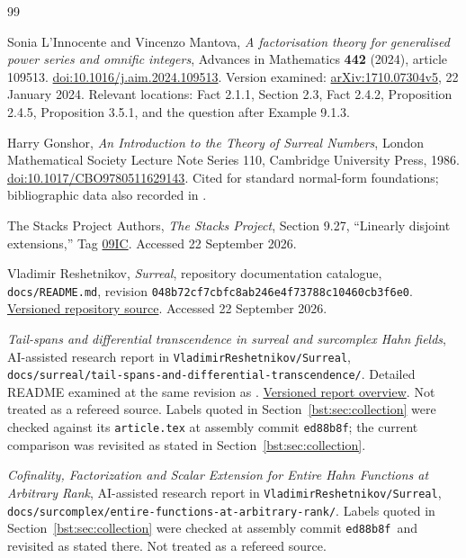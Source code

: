 \documentclass[11pt,letterpaper]{article}
\theoremstyle{definition}
\theoremstyle{remark}
\newcommand{\repo}{\texttt{VladimirReshetnikov/Surreal}}
\newcommand{\assemblycommit}{\texttt{ed88b8f}}
\begin{document}
\begin{thebibliography}{99}
\raggedright
{}
Sonia L'Innocente and Vincenzo Mantova,
\emph{A factorisation theory for generalised power series and omnific integers},
Advances in Mathematics \textbf{442} (2024), article 109513.
\href{https://doi.org/10.1016/j.aim.2024.109513}{doi:10.1016/j.aim.2024.109513}.
Version examined: \href{https://arxiv.org/abs/1710.07304v5}{arXiv:1710.07304v5},
22 January 2024. Relevant locations: Fact 2.1.1, Section 2.3,
Fact 2.4.2, Proposition 2.4.5, Proposition 3.5.1, and the question after
Example 9.1.3.

Harry Gonshor, \emph{An Introduction to the Theory of Surreal Numbers},
London Mathematical Society Lecture Note Series 110, Cambridge University
Press, 1986.
\href{https://doi.org/10.1017/CBO9780511629143}{doi:10.1017/CBO9780511629143}.
Cited for standard normal-form foundations; bibliographic data also
recorded in \cite{LM24}.

The Stacks Project Authors,
\emph{The Stacks Project}, Section 9.27, ``Linearly disjoint extensions,''
Tag \href{https://stacks.math.columbia.edu/tag/09IC}{09IC}.
Accessed 22 September 2026.

Vladimir Reshetnikov, \emph{Surreal}, repository documentation catalogue,
\texttt{docs/README.md}, revision
\texttt{048b72cf7cbfc8ab246e4f73788c10460cb3f6e0}.
\href{https://github.com/VladimirReshetnikov/Surreal/blob/048b72cf7cbfc8ab246e4f73788c10460cb3f6e0/docs/README.md}{Versioned repository source}.
Accessed 22 September 2026.

\emph{Tail-spans and differential transcendence in surreal and surcomplex
Hahn fields}, AI-assisted research report in \repo,
\texttt{docs/surreal/tail-spans-and-differential-transcendence/}.
Detailed README examined at the same revision as \cite{RepoCatalogue}.
\href{https://github.com/VladimirReshetnikov/Surreal/blob/048b72cf7cbfc8ab246e4f73788c10460cb3f6e0/docs/surreal/tail-spans-and-differential-transcendence/README.md}{Versioned report overview}.
Not treated as a refereed source. Labels quoted in
Section~\ref{bst:sec:collection} were checked against its \texttt{article.tex}
at assembly commit \assemblycommit; the current comparison was revisited
as stated in Section~\ref{bst:sec:collection}.

\emph{Cofinality, Factorization and Scalar Extension for Entire Hahn
Functions at Arbitrary Rank}, AI-assisted research report in \repo,
\texttt{docs/surcomplex/entire-functions-at-arbitrary-rank/}. Labels quoted
in Section~\ref{bst:sec:collection} were checked at assembly commit
\assemblycommit\ and revisited as stated there.
Not treated as a refereed source.


\end{thebibliography}
\end{document}
